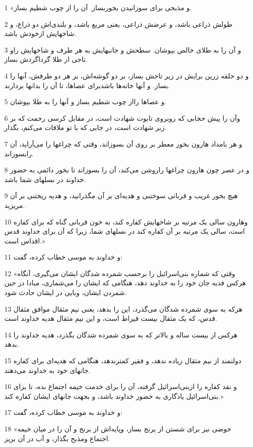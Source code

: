 \par 1 «و مذبحی برای سوزانیدن بخوربساز. آن را از چوب شطیم بساز.
\par 2 طولش ذراعی باشد، و عرضش ذراعی، یعنی مربع باشد، و بلندی‌اش دو ذراع، و شاخهایش ازخودش باشد.
\par 3 و آن را به طلای خالص بپوشان. سطحش و جانبهایش به هر طرف و شاخهایش راو تاجی از طلا گرداگردش بساز.
\par 4 و دو حلقه زرین برایش در زیر تاجش بساز، بر دو گوشه‌اش، بر هر دو طرفش، آنها را بساز. و آنها خانه‌ها باشدبرای عصاها، تا آن را بدانها بردارند.
\par 5 و عصاها رااز چوب شطیم بساز و آنها را به طلا بپوشان.
\par 6 وآن را پیش حجابی که روبروی تابوت شهادت است، در مقابل کرسی رحمت که بر زبر شهادت است، در جایی که با تو ملاقات می‌کنم، بگذار.
\par 7 و هر بامداد هارون بخور معطر بر روی آن بسوزاند، وقتی که چراغها را می‌آراید، آن رابسوزاند.
\par 8 و در عصر چون هارون چراغها راروشن می‌کند، آن را بسوزاند تا بخور دائمی به حضور خداوند در نسلهای شما باشد.
\par 9 هیچ بخور غریب و قربانی سوختنی و هدیه‌ای بر آن مگذرانید، و هدیه ریختنی بر آن مریزید.
\par 10 وهارون سالی یک مرتبه بر شاخهایش کفاره کند، به خون قربانی گناه که برای کفاره است، سالی یک مرتبه بر آن کفاره کند در نسلهای شما، زیرا که آن برای خداوند قدس اقداس است.»
\par 11 و خداوند به موسی خطاب کرده، گفت:
\par 12 «وقتی که شماره بنی‌اسرائیل را برحسب شمرده شدگان ایشان می‌گیری، آنگاه هرکس فدیه جان خود را به خداوند دهد، هنگامی که ایشان را می‌شماری، مبادا در حین شمردن ایشان، وبایی در ایشان حادث شود.
\par 13 هر‌که به سوی شمرده شدگان می‌گذرد، این را بدهد، یعنی نیم مثقال موافق مثقال قدس، که یک مثقال بیست قیراط است، و این نیم مثقال هدیه خداوند است.
\par 14 هرکس از بیست ساله و بالاتر که به سوی شمرده شدگان بگذرد، هدیه خداوند را بدهد.
\par 15 دولتمند از نیم مثقال زیاده ندهد، و فقیر کمترندهد، هنگامی که هدیه‌ای برای کفاره جانهای خود به خداوند می‌دهند.
\par 16 و نقد کفاره را ازبنی‌اسرائیل گرفته، آن را برای خدمت خیمه اجتماع بده، تا برای بنی‌اسرائیل یادگاری به حضور خداوند باشد، و بجهت جانهای ایشان کفاره کند.»
\par 17 و خداوند به موسی خطاب کرده، گفت:
\par 18 «حوضی نیز برای شستن از برنج بساز، وپایه‌اش از برنج و آن را در میان خیمه اجتماع ومذبح بگذار، و آب در آن بریز.
